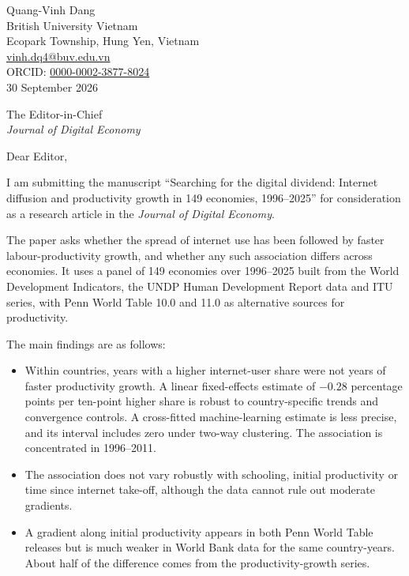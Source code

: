 \documentclass[11pt]{article}
\begin{document}
\begin{flushright}
Quang-Vinh Dang\\
British University Vietnam\\
Ecopark Township, Hung Yen, Vietnam\\
\href{mailto:vinh.dq4@buv.edu.vn}{vinh.dq4@buv.edu.vn}\\
ORCID: \href{https://orcid.org/0000-0002-3877-8024}{0000-0002-3877-8024}\\[1em]
30 September 2026
\end{flushright}

The Editor-in-Chief\\
\emph{Journal of Digital Economy}

Dear Editor,

I am submitting the manuscript ``Searching for the digital dividend: Internet diffusion and productivity growth in 149 economies, 1996--2025'' for consideration as a research article in the \emph{Journal of Digital Economy}.

The paper asks whether the spread of internet use has been followed by faster labour-productivity growth, and whether any such association differs across economies. It uses a panel of 149 economies over 1996--2025 built from the World Development Indicators, the UNDP Human Development Report data and ITU series, with Penn World Table 10.0 and 11.0 as alternative sources for productivity.

The main findings are as follows:
\begin{itemize}\setlength\itemsep{0pt}
\item Within countries, years with a higher internet-user share were not years of faster productivity growth. A linear fixed-effects estimate of $-0.28$ percentage points per ten-point higher share is robust to country-specific trends and convergence controls. A cross-fitted machine-learning estimate is less precise, and its interval includes zero under two-way clustering. The association is concentrated in 1996--2011.
\item The association does not vary robustly with schooling, initial productivity or time since internet take-off, although the data cannot rule out moderate gradients.
\item A gradient along initial productivity appears in both Penn World Table releases but is much weaker in World Bank data for the same country-years. About half of the difference comes from the productivity-growth series.
\end{itemize}
\end{document}
